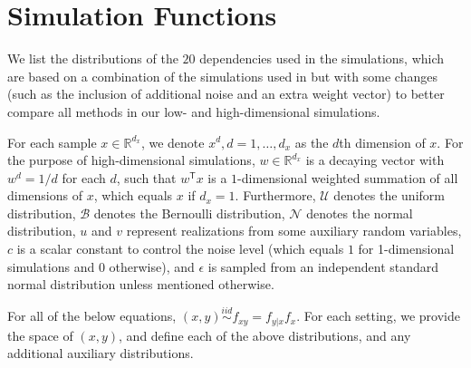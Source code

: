 \documentclass[11pt]{article}
\providecommand{\mc}[1]{\mathcal{#1}}
\newcommand{\Real}{\mathbb{R}}
\newcommand{\T}{^{\ensuremath{\mathsf{T}}}}           %
\begin{document}
\appendix
\setcounter{figure}{0}
\renewcommand\thefigure{A\arabic{figure}} 

\section{Simulation Functions}
\label{appen:function}

We list the distributions of the $20$ dependencies used in the simulations, which are based on a combination of the simulations used in \cite{SzekelyRizzoBakirov2007, SimonTibshirani2012, SimonTibshirani2012, GorfineHellerHeller2012} but with some changes (such as the inclusion of additional noise and an extra weight vector) to better compare all methods in our low- and high-dimensional simulations.

For each sample $x \in \Real^{d_{x}}$, we denote $x^{d}, d=1,\ldots,d_{x}$ as the $d$th dimension of $x$. For the purpose of high-dimensional simulations, $w \in \Real^{d_{x}}$ is a decaying vector with $w^{d}=1/d$ for each $d$, such that $w\T x$ is a $1$-dimensional weighted summation of all dimensions of $x$, which equals $x$ if $d_{x}=1$. Furthermore, $\mc{U}$ denotes the uniform distribution, $\mc{B}$ denotes the Bernoulli distribution, $\mc{N}$ denotes the normal distribution, $u$ and $v$ represent realizations from some auxiliary random variables, $c$ is a scalar constant to control the noise level (which equals $1$ for 1-dimensional simulations and $0$ otherwise), and $\epsilon$ is sampled from an independent standard normal distribution unless mentioned otherwise. 

For all of the below equations, $(x,y) \overset{iid}{\sim} f_{xy} = f_{y|x} f_x$. For each setting, we provide the space of $(x,y)$, and define each of the above distributions, and any additional auxiliary distributions.
\end{document}
